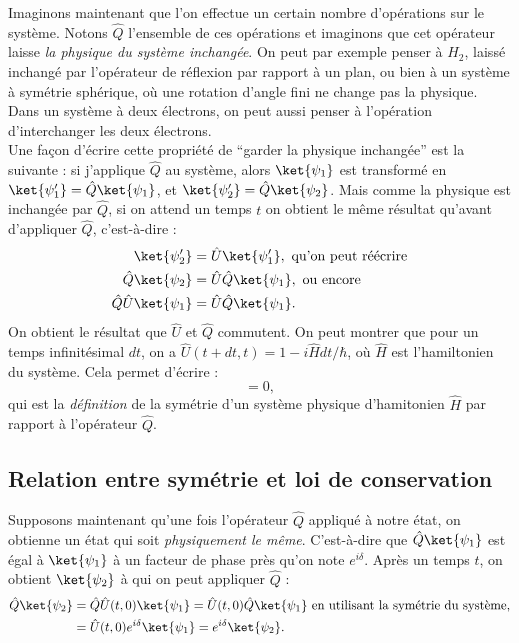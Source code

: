 Imaginons maintenant que l'on effectue un certain nombre d'opérations sur le système. Notons $\hat{Q}$ l'ensemble de ces opérations et imaginons que cet opérateur laisse \textit{la physique du système inchangée}. On peut par exemple penser à $H_2$, laissé inchangé par l'opérateur de réflexion par rapport à un plan, ou bien à un système à symétrie sphérique, où une rotation d'angle fini ne change pas la physique. Dans un système à deux électrons, on peut aussi penser à l'opération d'interchanger les deux électrons. \\
Une façon d'écrire cette propriété de ``garder la physique inchangée'' est la suivante : si j'applique $\hat{Q}$ au système, alors $\ket{\psi_1}$ est transformé en $\ket{\psi'_1}=\hat{Q}\ket{\psi_1}$, et $\ket{\psi'_2}=\hat{Q}\ket{\psi_2}$. Mais comme la physique est inchangée par $\hat{Q}$, si on attend un temps $t$ on obtient le même résultat qu'avant d'appliquer $\hat{Q}$, c'est-à-dire :
\begin{align*}
\ket{\psi'_2}&=\hat{U}\ket{\psi'_1}, \mbox{ qu'on peut réécrire}\\
\hat{Q}\ket{\psi_2}&=\hat{U}\hat{Q}\ket{\psi_1}, \mbox{ ou encore}\\
\hat{Q}\hat{U}\ket{\psi_1}&=\hat{U}\hat{Q}\ket{\psi_1}.
\end{align*}
On obtient le résultat que $\hat{U}$ et $\hat{Q}$ commutent. On peut montrer que pour un temps infinitésimal $dt$, on a $\hat{U}(t+dt,t) = 1-i\hat{H}dt/\hbar$, où $\hat{H}$ est l'hamiltonien du système. Cela permet d'écrire :
\begin{equation*}
[\hat{H},\hat{Q}]=0,
\end{equation*}
qui est la \textit{définition} de la symétrie d'un système physique d'hamitonien $\hat{H}$ par rapport à l'opérateur $\hat{Q}$.

\subsection{Relation entre symétrie et loi de conservation}
Supposons maintenant qu'une fois l'opérateur $\hat{Q}$ appliqué à notre état, on obtienne un état qui soit \textit{physiquement le même}. C'est-à-dire que $\hat{Q}\ket{\psi_1}$ est égal à $\ket{\psi_1}$ à un facteur de phase près qu'on note $e^{i\delta}$. Après un temps $t$, on obtient $\ket{\psi_2}$ à qui on peut appliquer $\hat{Q}$ :
\begin{align*}
\hat{Q}\ket{\psi_2}&=\hat{Q}\hat{U}(t,0)\ket{\psi_1}=\hat{U}(t,0)\hat{Q}\ket{\psi_1} \mbox{ en utilisant la symétrie du système,}\\
		&=\hat{U}(t,0)e^{i\delta}\ket{\psi_1}=e^{i\delta}\ket{\psi_2}.
\end{align*}

